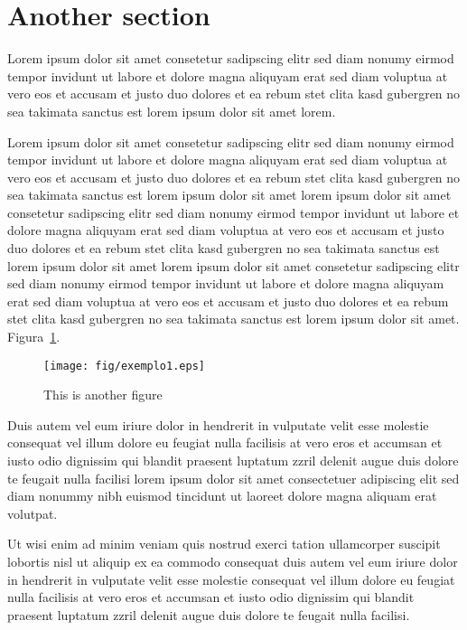 \section{Another section}

Lorem ipsum dolor sit amet consetetur sadipscing elitr sed diam
nonumy eirmod tempor invidunt ut labore et dolore magna aliquyam
erat sed diam voluptua at vero eos et accusam et justo duo dolores
et ea rebum stet clita kasd gubergren no sea takimata sanctus est
lorem ipsum dolor sit amet lorem.~\cite{XIAOAPL05}

Lorem ipsum dolor sit amet consetetur sadipscing elitr sed diam
nonumy eirmod tempor invidunt ut labore et dolore magna aliquyam
erat sed diam voluptua at vero eos et accusam et justo duo dolores
et ea rebum stet clita kasd gubergren no sea takimata sanctus est
lorem ipsum dolor sit amet lorem ipsum dolor sit amet consetetur
sadipscing elitr sed diam nonumy eirmod tempor invidunt ut labore
et dolore magna aliquyam erat sed diam voluptua at vero eos et
accusam et justo duo dolores et ea rebum stet clita kasd gubergren
no sea takimata sanctus est lorem ipsum dolor sit amet lorem ipsum
dolor sit amet consetetur sadipscing elitr sed diam nonumy eirmod
tempor invidunt ut labore et dolore magna aliquyam erat sed diam
voluptua at vero eos et accusam et justo duo dolores et ea rebum
stet clita kasd gubergren no sea takimata sanctus est lorem ipsum
dolor sit amet. Figura~\ref{fig:fig2}.

\begin{figure}[htb]
\centering\texttt{[image: fig/exemplo1.eps]}
\caption{\label{fig:fig2}This is another figure}
\end{figure}

Duis autem vel eum iriure dolor in hendrerit in vulputate velit
esse molestie consequat vel illum dolore eu feugiat nulla
facilisis at vero eros et accumsan et iusto odio dignissim qui
blandit praesent luptatum zzril delenit augue duis dolore te
feugait nulla facilisi lorem ipsum dolor sit amet consectetuer
adipiscing elit sed diam nonummy nibh euismod tincidunt ut laoreet
dolore magna aliquam erat volutpat.

Ut wisi enim ad minim veniam quis nostrud exerci tation
ullamcorper suscipit lobortis nisl ut aliquip ex ea commodo
consequat duis autem vel eum iriure dolor in hendrerit in
vulputate velit esse molestie consequat vel illum dolore eu
feugiat nulla facilisis at vero eros et accumsan et iusto odio
dignissim qui blandit praesent luptatum zzril delenit augue duis
dolore te feugait nulla facilisi.

